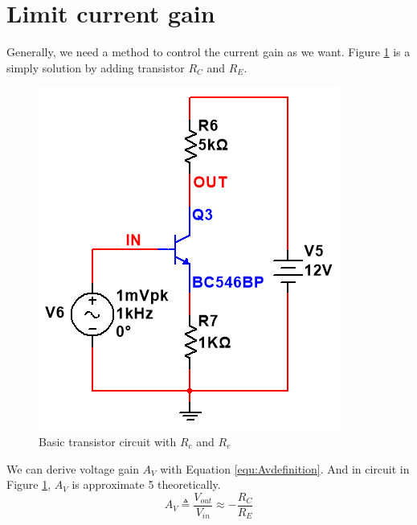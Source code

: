 
\section{Limit current gain} 
Generally, we need a method to control the current gain as we want. Figure \ref{fig:basictransistorcircuitwithRcandRe} is a simply solution by adding transistor $R_C$ and $R_E$.

\begin{figure}[htbp]
\centering
\includegraphics[scale=0.6]{"../Photo/Chap1/basic transistor circuit with Rc and Re"}
\caption{Basic transistor circuit with $R_c$ and $R_e$}
\label{fig:basictransistorcircuitwithRcandRe}
\end{figure}

We can derive voltage gain $A_V$ with Equation \ref{equ:Avdefinition}. And in circuit in Figure \ref{fig:basictransistorcircuitwithRcandRe}, $A_V$ is approximate 5 theoretically.
\begin{equation}
A_V \triangleq \frac{ V_{out}} { V_{in}} \approx -\frac{R_C}{R_E}
\label{equ:Avdefinition}
\end{equation}



